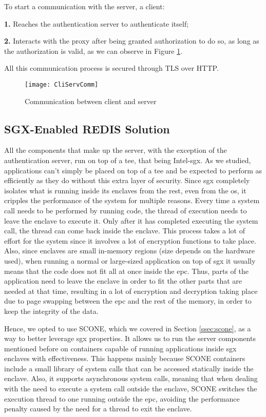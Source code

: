 To start a communication with the server, a client: 

\textbf{1.} Reaches the authentication server to authenticate itself;

\textbf{2.} Interacts with the proxy after being granted authorization to do so, as long as the authorization is valid, as we can observe in Figure \ref{fig:client_serverModel}. 

All this communication process is secured through TLS over HTTP.

\begin{figure}[htbp]
	\centering
	{\texttt{[image: CliServComm]}}
	\caption{Communication between client and server}
	\label{fig:client_serverModel}
\end{figure}



\subsection{SGX-Enabled REDIS Solution} %
\label{ssec:sgx_redisSolution}

All the components that make up the server, with the exception of the authentication server, run on top of a \gls{tee}, that being Intel-\gls{sgx}. As we studied, applications can't simply be placed on top of a \gls{tee} and be expected to perform as efficiently as they do without this extra layer of security. 
Since \gls{sgx} completely isolates what is running inside its enclaves from the rest, even from the \gls{os}, it cripples the performance of the system for multiple reasons. Every time a system call needs to be performed by running code, the thread of execution needs to leave the enclave to execute it. Only after it has completed executing the system call, the thread can come back inside the enclave. This process takes a lot of effort for the system since it involves a lot of encryption functions to take place. 
Also, since enclaves are small in-memory regions (size depends on the hardware used), when running a normal or large-sized application on top of \gls{sgx} it usually means that the code does not fit all at once inside the \gls{epc}. 
Thus, parts of the application need to leave the enclave in order to fit the other parts that are needed at that time, resulting in a lot of encryption and decryption taking place due to page swapping between the \gls{epc} and the rest of the memory, in order to keep the integrity of the data.  

Hence, we opted to use SCONE, which we covered in Section  \ref{ssec:scone}, as a way to better leverage \gls{sgx} properties. It allows us to run the server components mentioned before on containers capable of running applications inside \gls{sgx} enclaves with effectiveness. This happens mainly because SCONE containers include a small library of system calls that can be accessed statically inside the enclave. Also, it supports asynchronous system calls, meaning that when dealing with the need to execute a system call outside the enclave, SCONE switches the execution thread to one running outside the \gls{epc}, avoiding the performance penalty caused by the need for a thread to exit the enclave. 

